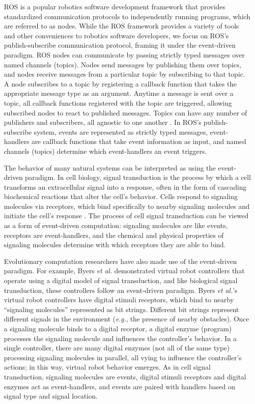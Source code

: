 ROS is a popular robotics software development framework that provides standardized communication protocols to independently running programs, which are referred to as nodes.
While the ROS framework provides a variety of tools and other conveniences to robotics software developers, we focus on ROS's publish-subscribe communication protocol, framing it under the event-driven paradigm. 
ROS nodes can communicate by passing strictly typed messages over named channels (topics). 
Nodes send messages by publishing them over topics, and nodes receive messages from a particular topic by subscribing to that topic. 
A node subscribes to a topic by registering a callback function that takes the appropriate message type as an argument. 
Anytime a message is sent over a topic, all callback functions registered with the topic are triggered, allowing subscribed nodes to react to published messages.
Topics can have any number of publishers and subscribers, all agnostic to one another \citep{quigley_ros:_2009}. 
In ROS's publish-subscribe system, events are represented as strictly typed messages, event-handlers are callback functions that take event information as input, and named channels (topics) determine which event-handlers an event triggers. 
 
The behavior of many natural systems can be interpreted as using the event-driven paradigm. 
In cell biology, signal transduction is the process by which a cell transforms an extracellular signal into a response, often in the form of cascading biochemical reactions that alter the cell's behavior. 
Cells respond to signaling molecules via receptors, which bind specifically to nearby signaling molecules and initiate the cell's response \citep{alberts_molecular_2002}. 
The process of cell signal transduction can be viewed as a form of event-driven computation: signaling molecules are like events, receptors are event-handlers, and the chemical and physical properties of signaling molecules determine with which receptors they are able to bind. 

Evolutionary computation researchers have also made use of the event-driven paradigm.
For example, Byers \textit{et al.} \citep{byers_digital_2011,byers_exploring_2012} demonstrated virtual robot controllers that operate using a digital model of signal transduction, and like biological signal transduction, these controllers follow an event-driven paradigm. 
Byers \textit{et al.}'s virtual robot controllers have digital stimuli receptors, which bind to nearby ``signaling molecules'' represented as bit strings.
Different bit strings represent different signals in the environment (\textit{e.g.}, the presence of nearby obstacles). 
Once a signaling molecule binds to a digital receptor, a digital enzyme (program) processes the signaling molecule and influences the controller's behavior. 
In a single controller, there are many digital enzymes (not all of the same type) processing signaling molecules in parallel, all vying to influence the controller's actions; in this way, virtual robot behavior emerges. 
As in cell signal transduction, signaling molecules are events, digital stimuli receptors and digital enzymes act as event-handlers, and events are paired with handlers based on signal type and signal location.